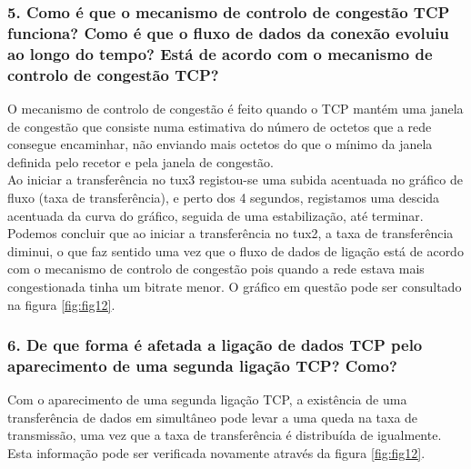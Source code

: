 \subsubsection{5. Como é que o mecanismo de controlo de congestão TCP funciona? Como é que o fluxo de dados da conexão evoluiu ao longo do tempo? Está de acordo com o mecanismo de controlo de congestão TCP?}
O mecanismo de controlo de congestão é feito quando o TCP mantém uma janela de congestão que consiste numa estimativa do número de octetos que a rede consegue encaminhar, não enviando mais octetos do que o mínimo da janela definida pelo recetor e pela janela de congestão.\\
Ao iniciar a transferência no tux3 registou-se uma subida acentuada no gráfico de fluxo (taxa de transferência), e perto dos 4 segundos, registamos uma descida acentuada da curva do gráfico, seguida de uma estabilização, até terminar. Podemos concluir que ao iniciar a transferência no tux2, a taxa de transferência diminui, o que faz sentido uma vez que o fluxo de dados de ligação está de acordo com o mecanismo de controlo de congestão pois quando a rede estava mais congestionada tinha um bitrate menor. O gráfico em questão pode ser consultado na figura \ref{fig:fig12}.

\subsubsection{6. De que forma é afetada a ligação de dados TCP pelo aparecimento de uma segunda ligação TCP? Como?}
Com o aparecimento de uma segunda ligação TCP, a existência de uma transferência de dados em simultâneo pode levar a uma queda na taxa de transmissão, uma vez que a taxa de transferência é distribuída de igualmente. Esta informação pode ser verificada novamente através da figura \ref{fig:fig12}.